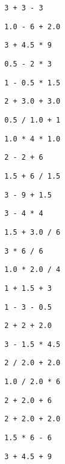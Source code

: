 \begin{exercise}
\begin{sltasks}[resume=true]
\begin{items}
    \end{items}
    \task
    \begin{items}
      \item \texttt{ 3 + 3 - 3 }
      \item \texttt{ 1.0 - 6 + 2.0 }
      \item \texttt{ 3 + 4.5 * 9 }
      \item \texttt{ 0.5 - 2 * 3 }
      \item \texttt{ 1 - 0.5 * 1.5 }
    \end{items}
    \task
    \begin{items}
      \item \texttt{ 2 + 3.0 + 3.0 }
      \item \texttt{ 0.5 / 1.0 + 1 }
      \item \texttt{ 1.0 * 4 * 1.0 }
      \item \texttt{ 2 - 2 + 6 }
      \item \texttt{ 1.5 + 6 / 1.5 }
    \end{items}
    \task
    \begin{items}
      \item \texttt{ 3 - 9 + 1.5 }
      \item \texttt{ 3 - 4 * 4 }
      \item \texttt{ 1.5 + 3.0 / 6 }
      \item \texttt{ 3 * 6 / 6 }
      \item \texttt{ 1.0 * 2.0 / 4 }
    \end{items}
    \task
    \begin{items}
      \item \texttt{ 1 + 1.5 + 3 }
      \item \texttt{ 1 - 3 - 0.5 }
      \item \texttt{ 2 + 2 + 2.0 }
      \item \texttt{ 3 - 1.5 * 4.5 }
      \item \texttt{ 2 / 2.0 + 2.0 }
    \end{items}
    \task
    \begin{items}
      \item \texttt{ 1.0 / 2.0 * 6 }
      \item \texttt{ 2 + 2.0 + 6 }
      \item \texttt{ 2 + 2.0 + 2.0 }
      \item \texttt{ 1.5 * 6 - 6 }
      \item \texttt{ 3 + 4.5 + 9 }
    \end{items}
\end{sltasks}
\end{exercise}

